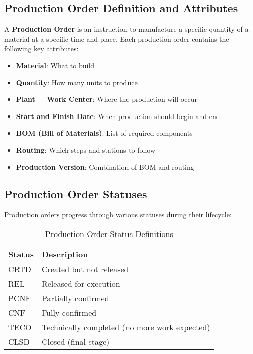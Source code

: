 \subsection{Production Order Definition and Attributes}

A \textbf{Production Order} is an instruction to manufacture a specific quantity of a material at a specific time and place. Each production order contains the following key attributes:

\begin{itemize}
    \item \textbf{Material}: What to build
    \item \textbf{Quantity}: How many units to produce
    \item \textbf{Plant + Work Center}: Where the production will occur
    \item \textbf{Start and Finish Date}: When production should begin and end
    \item \textbf{BOM (Bill of Materials)}: List of required components
    \item \textbf{Routing}: Which steps and stations to follow
    \item \textbf{Production Version}: Combination of BOM and routing
\end{itemize}

\subsection{Production Order Statuses}

Production orders progress through various statuses during their lifecycle:

\begin{table}[h]
\centering
\caption{Production Order Status Definitions}
\label{tab:po-statuses}
\begin{tabular}{@{}ll@{}}
\toprule
\textbf{Status} & \textbf{Description} \\
\midrule
CRTD & Created but not released \\
REL & Released for execution \\
PCNF & Partially confirmed \\
CNF & Fully confirmed \\
TECO & Technically completed (no more work expected) \\
CLSD & Closed (final stage) \\
\bottomrule
\end{tabular}
\end{table}

